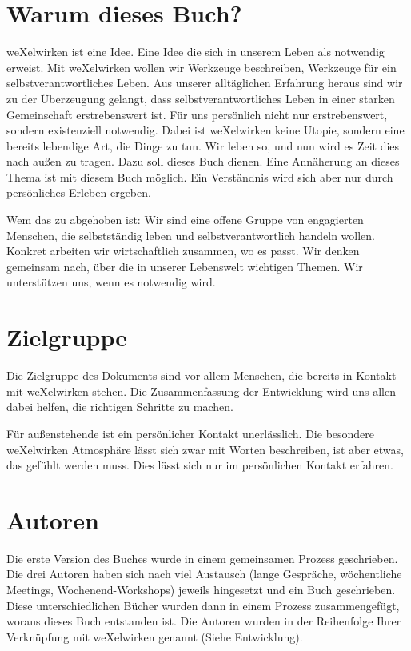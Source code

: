   \section{Warum dieses Buch?}
weXelwirken ist eine Idee.
%
Eine Idee die sich in unserem Leben als notwendig erweist. 
%
Mit weXelwirken wollen wir Werkzeuge beschreiben, Werkzeuge für ein selbstverantwortliches Leben.
%
Aus unserer alltäglichen Erfahrung heraus sind wir zu der Überzeugung gelangt, dass selbstverantwortliches Leben in einer starken Gemeinschaft erstrebenswert ist.
%
Für uns persönlich nicht nur erstrebenswert, sondern existenziell notwendig.
%
Dabei ist weXelwirken keine Utopie, sondern eine bereits lebendige Art, die Dinge zu tun.
%
Wir leben so, und nun wird es Zeit dies nach außen zu tragen.
%
Dazu soll dieses Buch dienen.
%
Eine Annäherung an dieses Thema ist mit diesem Buch möglich.
%
Ein Verständnis wird sich aber nur durch persönliches Erleben ergeben.



Wem das zu abgehoben ist: Wir sind eine offene Gruppe von engagierten Menschen, die selbstständig leben und selbstverantwortlich handeln wollen.
%
Konkret arbeiten wir wirtschaftlich zusammen, wo es passt.
%
Wir denken gemeinsam nach, über die in unserer Lebenswelt wichtigen Themen.
%
Wir unterstützen uns, wenn es notwendig wird.
  \section{Zielgruppe}
Die Zielgruppe des Dokuments sind vor allem Menschen, die bereits in Kontakt mit weXelwirken stehen.
%
Die Zusammenfassung der Entwicklung wird uns allen dabei helfen, die richtigen Schritte zu machen. 



Für außenstehende ist ein persönlicher Kontakt unerlässlich.
%
Die besondere weXelwirken Atmosphäre lässt sich zwar mit Worten beschreiben, ist aber etwas, das gefühlt werden muss.
%
Dies lässt sich nur im persönlichen Kontakt erfahren.
  \section{Autoren}
Die erste Version des Buches wurde in einem gemeinsamen Prozess geschrieben.
%
Die drei Autoren haben sich nach viel Austausch (lange Gespräche, wöchentliche Meetings, Wochenend-Workshops) jeweils hingesetzt und ein Buch geschrieben.
%
Diese unterschiedlichen Bücher wurden dann in einem Prozess zusammengefügt, woraus dieses Buch entstanden ist.
%
Die Autoren wurden in der Reihenfolge Ihrer Verknüpfung mit weXelwirken genannt (Siehe Entwicklung).
